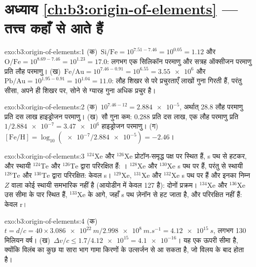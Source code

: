 \section*{अध्याय \ref{ch:b3:origin-of-elements} --- तत्त्व कहाँ से आते हैं}

\begin{solution}{exo:b3:origin-of-elements:1}
(क)~$\mathrm{Si/Fe} = 10^{7.51 - 7.46} = 10^{0.05} = 1.12$ और
$\mathrm{O/Fe} = 10^{8.69 - 7.46} = 10^{1.23} = 17.0$: लगभग एक सिलिकॉन
परमाणु और सत्रह ऑक्सीजन परमाणु प्रति लौह परमाणु। (ख)~$\mathrm{Fe/Au} =
10^{7.46 - 0.91} = 10^{6.55} = \num{3.55e6}$ और $\mathrm{Pb/Au} =
10^{1.95 - 0.91} = 10^{1.04} = 11.0$: लौह शिखर से परे प्रचुरताएँ
लाखों गुना गिरती हैं, परंतु सीसा, अपने ही शिखर पर, सोने से ग्यारह गुना
अधिक प्रचुर है।
\end{solution}

\begin{solution}{exo:b3:origin-of-elements:2}
(क)~$10^{7.46 - 12} = \num{2.884e-5}$, अर्थात् \num{28.8} लौह परमाणु प्रति
दस लाख हाइड्रोजन परमाणु। (ख)~सौ गुना कम: \num{0.288} प्रति
दस लाख, एक लौह परमाणु प्रति $1/\num{2.884e-7} = \num{3.47e6}$ हाइड्रोजन
परमाणु। (ग)~$[\mathrm{Fe/H}] = \log_{10}(\num{e-7}/\num{2.884e-5}) =
-2.46$।
\end{solution}

\begin{solution}{exo:b3:origin-of-elements:3}
$^{124}\mathrm{Xe}$ और $^{126}\mathrm{Xe}$ प्रोटॉन-समृद्ध पक्ष पर स्थित हैं,
s पथ से हटकर, और स्थायी $^{124}\mathrm{Te}$ और
$^{126}\mathrm{Te}$ द्वारा परिरक्षित हैं: । $^{128}\mathrm{Xe}$ और $^{130}\mathrm{Xe}$
s पथ पर हैं, परंतु
 से स्थायी $^{128}\mathrm{Te}$ और $^{130}\mathrm{Te}$ द्वारा परिरक्षित: केवल s। $^{129}\mathrm{Xe}$,
$^{131}\mathrm{Xe}$ और $^{132}\mathrm{Xe}$ s पथ पर हैं और इनका
निम्न $Z$ वाला कोई स्थायी समभारिक नहीं है (आयोडीन में केवल 127 है): दोनों प्रक्रम।
$^{134}\mathrm{Xe}$ और $^{136}\mathrm{Xe}$ उस सीमा के पार स्थित हैं,
$^{133}\mathrm{Xe}$ के आगे, जहाँ s पथ ज़ेनॉन से हट जाता है, और
परिरक्षित नहीं हैं: केवल r।
\end{solution}

\begin{solution}{exo:b3:origin-of-elements:4}
(क)~$t = d/c = 40\times\qty{3.086e22}{m}/\qty{2.998e8}{m.s^{-1}} =
\qty{4.12e15}{s}$, लगभग \num{130} मिलियन वर्ष। (ख)~$\Delta v/c \le
1.7/\num{4.12e15} = \num{4.1e-16}$। यह एक ऊपरी सीमा है, क्योंकि विलंब का
कुछ या सारा भाग गामा किरणों के उत्सर्जन से आ सकता है, जो
विलय के बाद होता है।
\end{solution}

